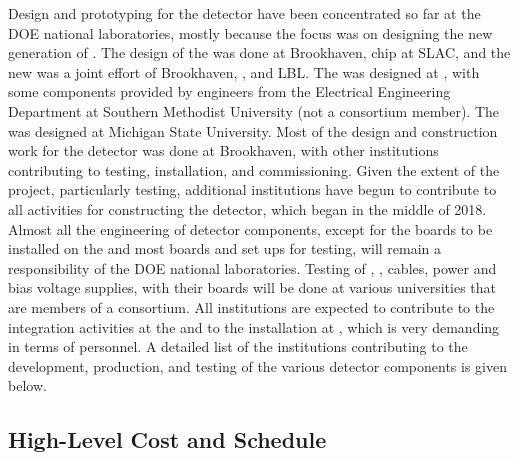 Design and prototyping for the   detector have 
been concentrated so far at the DOE national laboratories, mostly
because the focus was on designing the new generation of 
. The design of the   was
done at Brookhaven,  chip at SLAC, and the new  was a joint effort of Brookhaven,
, and LBL. The   was designed at , with
some components provided by engineers from the Electrical Engineering Department
at Southern Methodist University (not a consortium member).
The  was designed at Michigan State University.
Most of the
design and construction work for the  detector was done at Brookhaven, with other
institutions contributing to testing, installation, and
commissioning. Given the extent of the project, particularly testing, additional institutions have begun to contribute
to all activities for constructing the 
 detector, which began in the middle of 2018. Almost all
the engineering of detector components, except for the boards to be installed on the  and most boards and set ups for testing, will remain a responsibility
of the DOE national laboratories. Testing of 
, , cables, power and bias voltage supplies,
 with their boards will be done at various
universities that are members of a consortium. All institutions
are expected to contribute to the integration activities at
the  and to the installation at , which is very
demanding in terms of personnel. A detailed list of the 
institutions contributing to the development, production, and
testing of the various detector components is given below.

\subsection{High-Level Cost and Schedule}
\label{sec:fdsp-tpcelec-management-cost}


